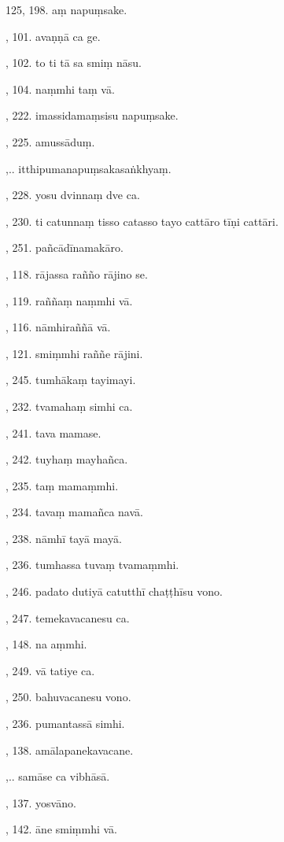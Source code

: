 125, 198. aṃ napuṃsake.\par {}, 101. avaṇṇā ca ge.\par {}, 102. to ti tā sa smiṃ nāsu.\par {}, 104. naṃmhi taṃ vā.\par {}, 222. imassidamaṃsisu napuṃsake.\par {}, 225. amussāduṃ.\par {},.. itthipumanapuṃsakasaṅkhyaṃ.\par {}, 228. yosu dvinnaṃ dve ca.\par {}, 230. ti catunnaṃ tisso catasso tayo cattāro tīṇi cattāri.\par {}, 251. pañcādīnamakāro.\par {}, 118. rājassa rañño rājino se.\par {}, 119. raññaṃ naṃmhi vā.\par {}, 116. nāmhiraññā vā.\par {}, 121. smiṃmhi raññe rājini.\par {}, 245. tumhākaṃ tayimayi.\par {}, 232. tvamahaṃ simhi ca.\par {}, 241. tava mamase.\par {}, 242. tuyhaṃ mayhañca.\par {}, 235. taṃ mamaṃmhi.\par {}, 234. tavaṃ mamañca navā.\par {}, 238. nāmhī tayā mayā.\par {}, 236. tumhassa tuvaṃ tvamaṃmhi.\par {}, 246. padato dutiyā catutthī chaṭṭhīsu vono.\par {}, 247. temekavacanesu ca.\par {}, 148. na aṃmhi.\par {}, 249. vā tatiye ca.\par {}, 250. bahuvacanesu vono.\par {}, 236. pumantassā simhi.\par {}, 138. amālapanekavacane.\par {},.. samāse ca vibhāsā.\par {}, 137. yosvāno.\par {}, 142. āne smiṃmhi vā.\par \noindent
